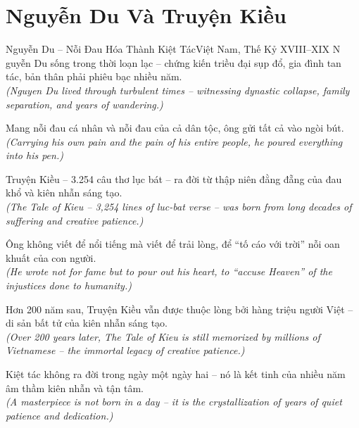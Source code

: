 \section{Nguyễn Du Và Truyện Kiều}
\begin{truyen}{Nguyễn Du -- Nỗi Đau Hóa Thành Kiệt Tác}{Việt Nam, Thế Kỷ XVIII--XIX}
N guyễn Du sống trong thời loạn lạc -- chứng kiến triều đại sụp đổ, gia đình tan tác, bản thân phải phiêu bạc nhiều năm.\\
\textit{(Nguyen Du lived through turbulent times -- witnessing dynastic collapse, family separation, and years of wandering.)}

Mang nỗi đau cá nhân và nỗi đau của cả dân tộc, ông gửi tất cả vào ngòi bút.\\
\textit{(Carrying his own pain and the pain of his entire people, he poured everything into his pen.)}

Truyện Kiều -- 3.254 câu thơ lục bát -- ra đời từ thập niên đằng đẵng của đau khổ và kiên nhẫn sáng tạo.\\
\textit{(The Tale of Kieu -- 3,254 lines of luc-bat verse -- was born from long decades of suffering and creative patience.)}

Ông không viết để nổi tiếng mà viết để trải lòng, để ``tố cáo với trời'' nỗi oan khuất của con người.\\
\textit{(He wrote not for fame but to pour out his heart, to ``accuse Heaven'' of the injustices done to humanity.)}

Hơn 200 năm sau, Truyện Kiều vẫn được thuộc lòng bởi hàng triệu người Việt -- di sản bất tử của kiên nhẫn sáng tạo.\\
\textit{(Over 200 years later, The Tale of Kieu is still memorized by millions of Vietnamese -- the immortal legacy of creative patience.)}

\end{truyen}
\begin{baihoc}
  Kiệt tác không ra đời trong ngày một ngày hai -- nó là kết tinh của nhiều năm âm thầm kiên nhẫn và tận tâm.\\
  \textit{(A masterpiece is not born in a day -- it is the crystallization of years of quiet patience and dedication.)}
\end{baihoc}

